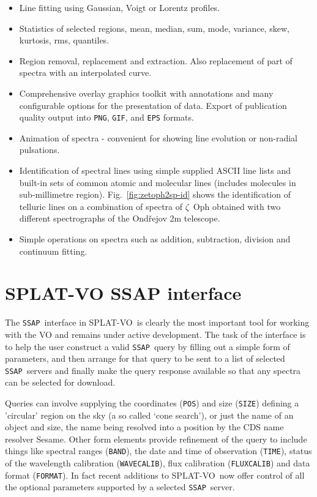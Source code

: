 \documentclass[final,authoryear,5p,times,twocolumn]{elsarticle}
\newcommand{\ssap}{\texttt{SSAP}}
\newcommand{\splatvo}{{\textsf{\small{SPLAT-VO}}}}
\newcommand{\Sesame}{\textsf{\small Sesame}}
\begin{document}
\begin{itemize}
\item Line fitting using Gaussian, Voigt or Lorentz profiles.

\item Statistics of selected regions, mean, median, sum, mode, variance, skew,
kurtosis, rms, quantiles.

\item Region removal, replacement and extraction. Also replacement of part of
spectra with an interpolated curve.

\item Comprehensive overlay graphics toolkit with annotations and many
configurable options for the presentation of data. Export of publication
quality output into \texttt{PNG}, \texttt{GIF}, and \texttt{EPS} formats.

\item Animation of spectra - convenient for showing line evolution or
non-radial pulsations.

\item Identification of spectral lines using simple supplied ASCII line lists
and built-in sets of common atomic and molecular lines (includes molecules in
sub-millimetre region). Fig.~\ref{fig:zetoph2sp-id} shows the identification of
telluric lines on a combination of spectra of $\zeta$~Oph obtained with two
different spectrographs of the Ond\v{r}ejov 2m telescope.

\item Simple operations on spectra such as addition, subtraction, division and
continuum fitting.

\end{itemize}

\section{SPLAT-VO SSAP interface}

The \ssap\ interface in \splatvo\ is clearly the most important tool for
working with the VO and remains under active development. The task of the
interface is to help the user construct a valid \ssap\ query by filling out a
simple form of parameters, and then arrange for that query to be sent to a list
of selected \ssap\ servers and finally make the query response available so
that any spectra can be selected for download.

Queries can involve supplying the coordinates (\texttt{POS}) and size
(\texttt{SIZE}) defining a 'circular' region on the sky (a so called `cone
search'), or just the name of an object and size, the name being resolved into
a position by the CDS name resolver \Sesame . Other form elements provide
refinement of the query to include things like spectral ranges (\texttt{BAND}),
the date and time of observation (\texttt{TIME}), status of the wavelength
calibration (\texttt{WAVECALIB}), flux calibration (\texttt{FLUXCALIB}) and
data format (\texttt{FORMAT}).  In fact recent additions to \splatvo\ now offer
control of all the optional parameters supported by a selected \ssap\ server.
\end{document}

